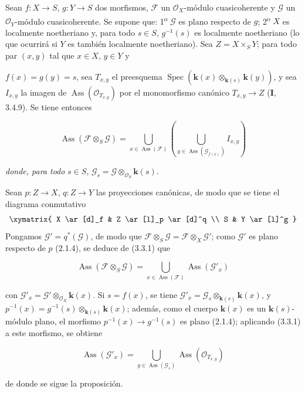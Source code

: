 \begin{proposition}[3.3.6]
\label{IV.2.3.3.6-fr}
Sean $f:X\to S$, $g:Y\to S$ dos morfismos, $\mathcal F$ un
$\mathcal O_X$-módulo cuasicoherente y $\mathcal G$ un $\mathcal O_Y$-módulo
cuasicoherente. Se supone que: 1\textsuperscript{o} $\mathcal G$ es plano
respecto de $g$; 2\textsuperscript{o} $X$ es localmente noetheriano y, para todo
$s\in S$, $g^{-1}(s)$ es localmente noetheriano (lo que ocurrirá si $Y$ es
también localmente noetheriano). Sea $Z=X\times_S Y$; para todo par $(x,y)$
tal que $x\in X$, $y\in Y$ y

$f(x)=g(y)=s$, sea $T_{x,y}$ el preesquema
$\operatorname{Spec}(\boldsymbol{k}(x)\otimes_{\mathbf{k}(s)}\boldsymbol{k}(y))$, y sea $I_{x,y}$ la imagen de
$\operatorname{Ass}(\mathcal O_{T_{x,y}})$ por el monomorfismo canónico
$T_{x,y}\to Z$ \textup{(\textbf I, 3.4.9)}. Se tiene entonces
\end{proposition}

\begin{env}[3.3.6.1]
\label{IV.2.3.3.6.1-fr}
\[
\operatorname{Ass}(\mathcal F\otimes_S\mathcal G)
=\bigcup_{x\in\operatorname{Ass}(\mathcal F)}
\left(\bigcup_{y\in\operatorname{Ass}(\mathcal G_{f(x)})}I_{x,y}\right)
\]
\end{env}

\textit{donde, para todo} $s\in S$, $\mathcal G_s=\mathcal G\otimes_{\mathcal O_S}\boldsymbol{k}(s)$.

Sean $p:Z\to X$, $q:Z\to Y$ las proyecciones canónicas, de modo que se tiene
el diagrama conmutativo
\[
\xymatrix{
X \ar[d]_f & Z \ar[l]_p \ar[d]^q \\
S & Y \ar[l]^g
}
\]
Pongamos $\mathcal G'=q^*(\mathcal G)$, de modo que
$\mathcal F\otimes_S\mathcal G=\mathcal F\otimes_X\mathcal G'$; como
$\mathcal G'$ es plano respecto de $p$ (2.1.4), se deduce de (3.3.1) que

\begin{env}[3.3.6.2]
\label{IV.2.3.3.6.2-fr}
\[
\operatorname{Ass}(\mathcal F\otimes_S\mathcal G)
=\bigcup_{x\in\operatorname{Ass}(\mathcal F)}
\operatorname{Ass}(\mathcal G'_x)
\]
\end{env}

con $\mathcal G'_x=\mathcal G'\otimes_{\mathcal O_X}\boldsymbol{k}(x)$. Si $s=f(x)$, se tiene
$\mathcal G'_x=\mathcal G_s\otimes_{\mathbf{k}(s)}\boldsymbol{k}(x)$, y
$p^{-1}(x)=g^{-1}(s)\otimes_{\mathbf{k}(s)}\boldsymbol{k}(x)$; además, como el cuerpo $\boldsymbol{k}(x)$ es un
$\boldsymbol{k}(s)$-módulo plano, el morfismo $p^{-1}(x)\to g^{-1}(s)$ es plano (2.1.4);
aplicando (3.3.1) a este morfismo, se obtiene

\begin{env}[3.3.6.3]
\label{IV.2.3.3.6.3-fr}
\[
\operatorname{Ass}(\mathcal G'_x)
=\bigcup_{y\in\operatorname{Ass}(\mathcal G_s)}
\operatorname{Ass}(\mathcal O_{T_{x,y}})
\]
\end{env}

de donde se sigue la proposición.
